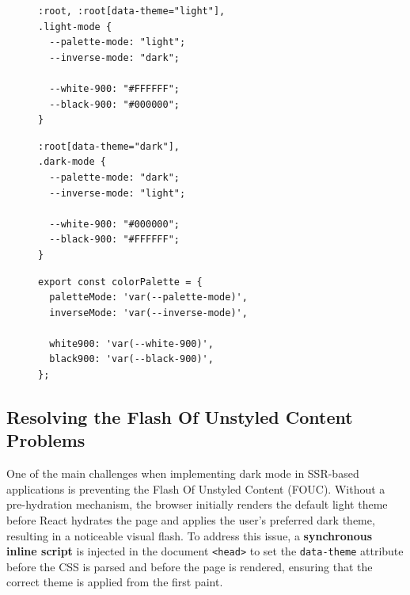 \begin{figure}[H]
    \centering
    \begin{minipage}[t]{0.48\textwidth}
        \begin{lstlisting}[caption={custom-light-variables.css}]
:root, :root[data-theme="light"],
.light-mode {
  --palette-mode: "light";
  --inverse-mode: "dark";

  --white-900: "#FFFFFF";
  --black-900: "#000000";
}
        \end{lstlisting}
    \end{minipage}
    \hfill
    \begin{minipage}[t]{0.48\textwidth}
        \begin{lstlisting}[caption={custom-dark-variables.css}]
:root[data-theme="dark"],
.dark-mode {
  --palette-mode: "dark";
  --inverse-mode: "light";
  
  --white-900: "#000000";
  --black-900: "#FFFFFF";
}
        \end{lstlisting}
    \end{minipage}
\label{fig:css-variables-palettes}
\end{figure}
\begin{figure}[h]
    \centering
    \begin{minipage}[t]{0.24\textwidth}
    \end{minipage}
    \hfill
    \begin{minipage}[t]{0.48\textwidth}
        \begin{lstlisting}[caption={colorPalette.ts}]
export const colorPalette = {
  paletteMode: 'var(--palette-mode)',
  inverseMode: 'var(--inverse-mode)',

  white900: 'var(--white-900)',
  black900: 'var(--black-900)',
};
        \end{lstlisting}
    \end{minipage}
    \hfill
    \begin{minipage}[t]{0.24\textwidth}
    \end{minipage}
\label{fig:color-palette}
\end{figure}

\subsection{Resolving the Flash Of Unstyled Content Problems}

One of the main challenges when implementing dark mode in \acs{SSR}-based applications is preventing the Flash Of Unstyled Content (FOUC). Without a pre-hydration mechanism, the browser initially renders the default light theme before React hydrates the page and applies the user's preferred dark theme, resulting in a noticeable visual flash. To address this issue, a \textbf{synchronous inline script} is injected in the document \texttt{<head>} to set the \texttt{data-theme} attribute before the CSS is parsed and before the page is rendered, ensuring that the correct theme is applied from the first paint.

